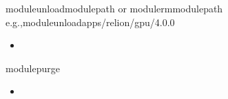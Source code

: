 \documentclass[a4paper,10pt,english]{sphinxmanual}
\begin{document}
\begin{sphinxVerbatim}[commandchars=\\\{\}]
\PYGZdl{}\PYGZgt{}moduleunload\PYGZlt{}module\PYGZus{}path\PYGZgt{}
or
\PYGZdl{}\PYGZgt{}modulerm\PYGZlt{}module\PYGZus{}path\PYGZgt{}
e.g.,\PYGZdl{}\PYGZgt{}moduleunloadapps/relion/gpu/4.0.0
\end{sphinxVerbatim}
\begin{itemize}
\item {} 
\sphinxAtStartPar
{}

\end{itemize}

\begin{sphinxVerbatim}[commandchars=\\\{\}]
\PYGZdl{}\PYGZgt{}modulepurge
\end{sphinxVerbatim}
\begin{itemize}
\item {} 
\sphinxAtStartPar
{}

\end{itemize}
\end{document}
